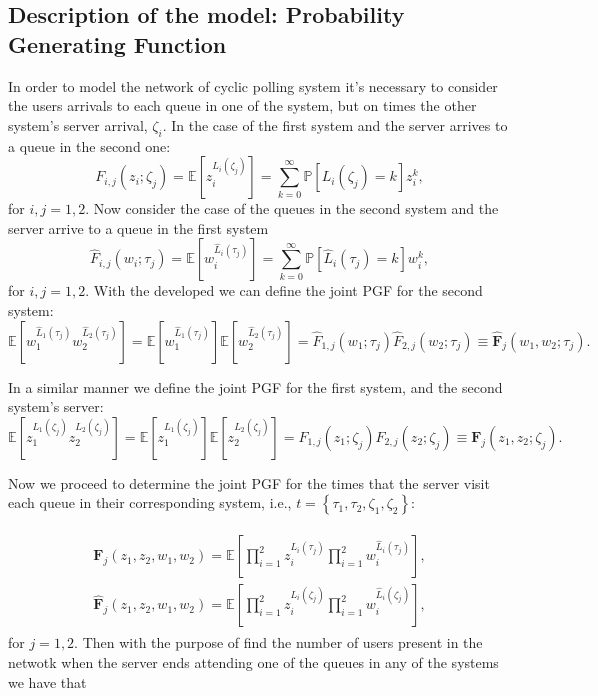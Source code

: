 \documentclass{article}
\newcommand{\esp}{\mathbb{E}}
\newcommand{\prob}{\mathbb{P}}
\begin{document}
\subsection{Description of the model: Probability Generating Function}
%

In order to model the network of cyclic polling system it's necessary to consider the users arrivals to each queue in one of the system, but on times the other system's server arrival, $\zeta_{i}$. In the case of the first system and the server arrives to a queue in the second one: $$F_{i,j}\left(z_{i};\zeta_{j}\right)=\esp\left[z_{i}^{L_{i}\left(\zeta_{j}\right)}\right]=
\sum_{k=0}^{\infty}\prob\left[L_{i}\left(\zeta_{j}\right)
=k\right]z_{i}^{k},$$ for $i,j=1,2$. Now consider the case of the queues in the second system and the server arrive to a queue in the first system $$\hat{F}_{i,j}\left(w_{i};\tau_{j}\right)=\esp\left[w_{i}^{\hat{L}_{i}\left(\tau_{j}\right)}\right] =\sum_{k=0}^{\infty}\prob\left[\hat{L}_{i}\left(\tau_{j}\right)
=k\right]w_{i}^{k},$$ for $i,j=1,2$. With the developed we can define the joint PGF for the second system:
$$\esp\left[w_{1}^{\hat{L}_{1}\left(\tau_{j}\right)}w_{2}^{\hat{L}_{2}\left(\tau_{j}\right)}\right]
=\esp\left[w_{1}^{\hat{L}_{1}\left(\tau_{j}\right)}\right]
\esp\left[w_{2}^{\hat{L}_{2}\left(\tau_{j}\right)}\right]=\hat{F}_{1,j}\left(w_{1};\tau_{j}\right)\hat{F}_{2,j}\left(w_{2};\tau_{j}\right)\equiv\hat{\mathbf{F}}_{j}\left(w_{1},w_{2};\tau_{j}\right).$$

In a similar manner we define the joint PGF for the first system, and the second system's server:
$$\esp\left[z_{1}^{L_{1}\left(\zeta_{j}\right)}z_{2}^{L_{2}\left(\zeta_{j}\right)}\right]
=\esp\left[z_{1}^{L_{1}\left(\zeta_{j}\right)}\right]
\esp\left[z_{2}^{L_{2}\left(\zeta_{j}\right)}\right]=F_{1,j}\left(z_{1};\zeta_{j}\right)F_{2,j}\left(z_{2};\zeta_{j}\right)\equiv\mathbf{F}_{j}\left(z_{1},z_{2};\zeta_{j}\right).$$

Now we proceed to determine the joint PGF for the times that the server visit each queue in their corresponding system, i.e., $t=\left\{\tau_{1},\tau_{2},\zeta_{1},\zeta_{2}\right\}$:

\begin{eqnarray}\label{Eq.Conjuntas}
\begin{array}{l}
\mathbf{F}_{j}\left(z_{1},z_{2},w_{1},w_{2}\right)=\esp\left[\prod_{i=1}^{2}z_{i}^{L_{i}\left(\tau_{j}
\right)}\prod_{i=1}^{2}w_{i}^{\hat{L}_{i}\left(\tau_{j}\right)}\right],\\
\hat{\mathbf{F}}_{j}\left(z_{1},z_{2},w_{1},w_{2}\right)=\esp\left[\prod_{i=1}^{2}z_{i}^{L_{i}
\left(\zeta_{j}\right)}\prod_{i=1}^{2}w_{i}^{\hat{L}_{i}\left(\zeta_{j}\right)}\right],
\end{array}
\end{eqnarray} for $j=1,2$. Then with the purpose of find the number of users present in the netwotk when the server ends attending one of the queues in any of the systems we have that
\end{document}
